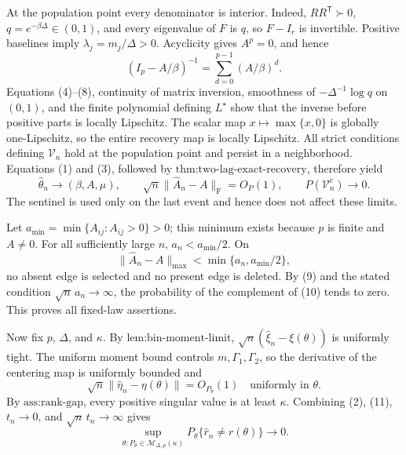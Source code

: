 At the population point every denominator is interior.  Indeed, \(RR^{\mathsf T}\succ0\), \(q=e^{-\beta\Delta}\in(0,1)\), and every eigenvalue of \(F\) is \(q\), so \(F-I_r\) is invertible.  Positive baselines imply \(\lambda_j=m_j/\Delta>0\).  Acyclicity gives \(A^p=0\), and hence
\[
 (I_p-A/\beta)^{-1}=\sum_{d=0}^{p-1}(A/\beta)^d.
\tag{8}
\]
Equations (4)--(8), continuity of matrix inversion, smoothness of \(-\Delta^{-1}\log q\) on \((0,1)\), and the finite polynomial defining \(L^\star\) show that the inverse before positive parts is locally Lipschitz.  The scalar map \(x\mapsto\max\{x,0\}\) is globally one-Lipschitz, so the entire recovery map is locally Lipschitz.  All strict conditions defining \(\mathcal V_n\) hold at the population point and persist in a neighborhood.  Equations (1) and (3), followed by \(\text{thm:two-lag-exact-recovery}\), therefore yield
\[
 \widehat\theta_n\longrightarrow(\beta,A,\mu),
 \qquad
 \sqrt n\lVert\widehat A_n-A\rVert_{\mathrm F}=O_P(1),
 \qquad
 P(\mathcal V_n^c)\longrightarrow0.
\tag{9}
\]
The sentinel is used only on the last event and hence does not affect these limits.

Let \(a_{\min}=\min\{A_{ij}:A_{ij}>0\}>0\); this minimum exists because \(p\) is finite and \(A\neq0\).  For all sufficiently large \(n\), \(a_n<a_{\min}/2\).  On
\[
 \lVert\widehat A_n-A\rVert_{\max}<\min\{a_n,a_{\min}/2\},
\tag{10}
\]
no absent edge is selected and no present edge is deleted.  By (9) and the stated condition \(\sqrt n\,a_n\to\infty\), the probability of the complement of (10) tends to zero.  This proves all fixed-law assertions.

Now fix \(p\), \(\Delta\), and \(\kappa\).  By \(\text{lem:bin-moment-limit}\), \(\sqrt n(\widehat\xi_n-\xi(\theta))\) is uniformly tight.  The uniform moment bound controls \(m,\Gamma_1,\Gamma_2\), so the derivative of the centering map is uniformly bounded and
\[
 \sqrt n\lVert\widehat\eta_n-\eta(\theta)\rVert=O_{P_\theta}(1)
 \quad\text{uniformly in }\theta.
\tag{11}
\]
By \(\text{ass:rank-gap}\), every positive singular value is at least \(\kappa\).  Combining (2), (11), \(t_n\to0\), and \(\sqrt n\,t_n\to\infty\) gives
\[
 \sup_{\theta:P_\theta\in\mathcal M_{\Delta,p}(\kappa)}
 P_\theta\{\widehat r_n\neq r(\theta)\}\longrightarrow0.
\tag{12}
\]

